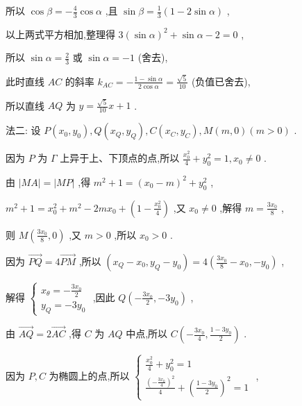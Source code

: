 \documentclass[10pt]{article}
\begin{document}
所以 \(\cos \beta  =  - \frac{4}{3}\cos \alpha\) ,且 \(\sin \beta  = \frac{1}{3}\left( {1 - 2\sin \alpha }\right)\) ,

以上两式平方相加,整理得 \(3{\left( \sin \alpha \right) }^{2} + \sin \alpha  - 2 = 0\) ,

所以 \(\sin \alpha  = \frac{2}{3}\) 或 \(\sin \alpha  =  - 1\) (舍去),

此时直线 \({AC}\) 的斜率 \({k}_{AC} =  - \frac{1 - \sin \alpha }{2\cos \alpha } = \frac{\sqrt{5}}{10}\) (负值已舍去),

所以直线 \({AQ}\) 为 \(y = \frac{\sqrt{5}}{10}x + 1\) .

法二: 设 \(P\left( {{x}_{0},{y}_{0}}\right) ,Q\left( {{x}_{Q},{y}_{Q}}\right) ,C\left( {{x}_{C},{y}_{C}}\right) ,M\left( {m,0}\right) \left( {m > 0}\right)\) .

因为 \(P\) 为 \(\Gamma\) 上异于上、下顶点的点,所以 \(\frac{{x}_{0}^{2}}{4} + {y}_{0}^{2} = 1,{x}_{0} \neq  0\) .

由 \(\left| {MA}\right|  = \left| {MP}\right|\) ,得 \({m}^{2} + 1 = {\left( {x}_{0} - m\right) }^{2} + {y}_{0}^{2}\) ,

\({m}^{2} + 1 = {x}_{0}^{2} + {m}^{2} - {2m}{x}_{0} + \left( {1 - \frac{{x}_{0}^{2}}{4}}\right)\) ,又 \({x}_{0} \neq  0\) ,解得 \(m = \frac{3{x}_{0}}{8}\) ,

则 \(M\left( {\frac{3{x}_{0}}{8},0}\right)\) ,又 \(m > 0\) ,所以 \({x}_{0} > 0\) .

因为 \(\overrightarrow{PQ} = 4\overrightarrow{PM}\) ,所以 \(\left( {{x}_{Q} - {x}_{0},{y}_{Q} - {y}_{0}}\right)  = 4\left( {\frac{3{x}_{0}}{8} - {x}_{0}, - {y}_{0}}\right)\) ,

解得 \(\left\{  \begin{array}{l} {x}_{\theta } =  - \frac{3{x}_{0}}{2} \\  {y}_{Q} =  - 3{y}_{0} \end{array}\right.\) ,因此 \(Q\left( {-\frac{3{x}_{0}}{2}, - 3{y}_{0}}\right)\) ,

由 \(\overrightarrow{AQ} = 2\overrightarrow{AC}\) ,得 \(C\) 为 \({AQ}\) 中点,所以 \(C\left( {-\frac{3{x}_{0}}{4},\frac{1 - 3{y}_{0}}{2}}\right)\) .

因为 \(P,C\) 为椭圆上的点,所以 \(\left\{  \begin{array}{l} \frac{{x}_{0}^{2}}{4} + {y}_{0}^{2} = 1 \\  \frac{{\left( -\frac{3{x}_{0}}{4}\right) }^{2}}{4} + {\left( \frac{1 - 3{y}_{0}}{2}\right) }^{2} = 1 \end{array}\right.\) ,
\end{document}
